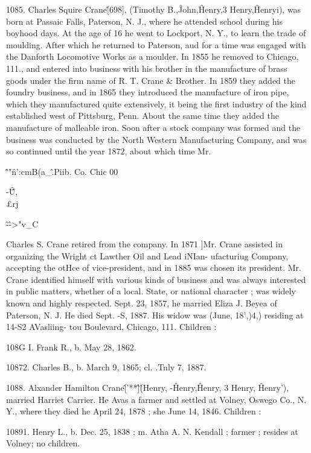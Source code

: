 1085. Charles Squire Crane\^ [698], (Timothy B.,\^ John,\^ 
Henry,3 Henry,\^ Henryi), was born at Passaic Falls, Paterson, 
N. J., where he attended school during his boyhood days. At 
the age of 16 he went to Lockport, N. Y., to learn the trade of 
moulding. After which he returned to Paterson, aud for a time 
was engaged with the Danforth Locomotive Works as a moulder. 
In 1855 he removed to Chicago, 111., and entered into business 
with his brother in the manufacture of brass goods under the firm 
name of R. T. Crane \& Brother. In 1859 they added the foundry 
business, and in 1865 they introduced the manufacture of iron 
pipe, which they manufactured quite extensively, it being the 
first industry of the kind established west of Pittsburg, Penn. 
About the same time they added the manufacture of malleable 
iron. Soon after a stock company was formed and the business 
was conducted by the North Western Manufacturing Company, 
and was so continued until the year 1872, about which time Mr. 




\^'"\^n':cmB(a\_\^.Piib. Co. Chic 00  



-\^\^ U, \\£rj 



\^-\^->"v\_C 




Charles S. Crane retired from the company. In 1871 ]Mr. Crane 
assisted in organizing the Wright ct Lawther Oil and Lead iNIan- 
ufacturiug Company, accepting the otHce of vice-president, and 
in 1885 was chosen its president. Mr. Crane identified himself 
with various kinds of business and was always interested in 
public matters, whether of a local. State, or national character ; 
was widely known and highly respected. Sept. 23, 1857, he 
married Eliza J. Beyea of Paterson, N. J. He died Sept. -S, 
1887. His widow was (June, 18',)4,) residing at 14-S2 AVasliing- 
tou Boulevard, Chicago, 111. Children : 

108G I. Frank R., b. May 28, 1862. 

10872. Charles B., b. March 9, 1865; cl. .Tnly 7, 1887. 

1088. Alxander Hamilton Crane\^ ['**\^]\^ (Henry, -\^ Henry,\^ 
Henry, 3 Henry, \^ Henry'), married Harriet Carrier. He Avas a 
farmer and settled at Volney, Oswego Co., N. Y., where they 
died he April 24, 1878 ; she June 14, 1846. Children : 

10891. Henry L., b. Dec. 25, 1838 ; m. Atha A. N. Kendall ; farmer ; 
resides at Volney; no children. 


